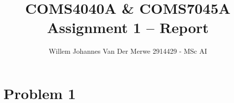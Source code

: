 
\title{COMS4040A \& COMS7045A Assignment 1 -- Report}
\author{Willem Johannes Van Der Merwe 2914429 - MSc AI}
\date{} 
\maketitle 
\pagestyle{fancy}
\fancyhf{}
\fancyhead[R]{\thepage}
\section{Problem 1}
 
